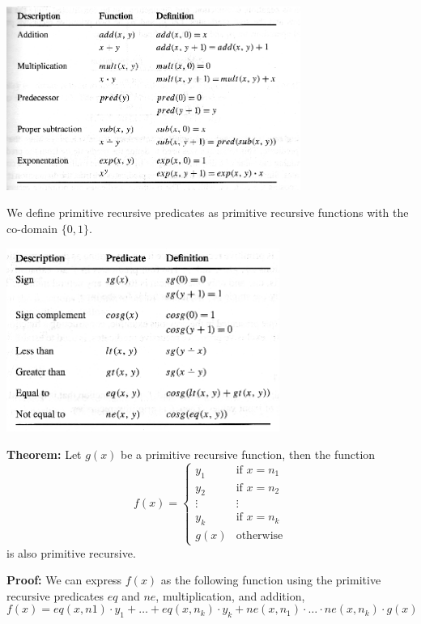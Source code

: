 \documentclass[a4paper,blends,pdf,colorBG,slideColor]{prosper}
\begin{document}
\es

\begin{center}
\includegraphics[height=60mm]{images/prfunctions.eps}
\end{center}

\es

{\small
We define primitive recursive predicates as primitive recursive functions with
the co-domain $\{0,1\}$.

\begin{center}
\includegraphics[height=60mm]{images/prpredicates.eps}
\end{center}
}


\es


\small
{\bf Theorem:} Let $g(x)$ be a primitive recursive function, then the function
\[
f(x) = \left \{
	\begin{array}{ll}
	y_1 & \text{if $x = n_1$}\\
	y_2 & \text{if $x = n_2$}\\
	\vdots&\vdots\\
	y_k & \text{if $x = n_k$}\\
	g(x) & \text{otherwise}
	\end{array}
	\right .
\]
is also primitive recursive.

{\bf Proof:} We can express $f(x)$ as the following function using the primitive recursive 
predicates $eq$ and $ne$, multiplication, and addition,
\[
f(x) = eq(x,n1)\cdot y_1 + \ldots +eq(x,n_k)\cdot y_k + ne(x,n_1)\cdot\ldots\cdot ne(x,n_k)\cdot g(x)
\]
\es
\end{document}
